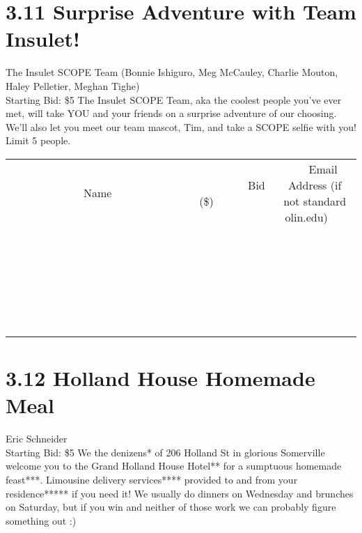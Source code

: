 \documentclass[11pt]{article}
\begin{document}
\section*{3.11 Surprise Adventure with Team Insulet!}
The Insulet SCOPE Team (Bonnie Ishiguro, Meg McCauley, Charlie Mouton, Haley Pelletier, Meghan Tighe)
\\
Starting Bid: \$5
\newline
The Insulet SCOPE Team, aka the coolest people you've ever met, will take YOU and your friends on a surprise adventure of our choosing. We'll also let you meet our team mascot, Tim, and take a SCOPE selfie with you! Limit 5 people.
\\[6ex]
\begin{tabular}{c c c}
~~~~~~~~~~~~~Name~~~~~~~~~~~~~ & ~~~~~~~~~Bid (\$)~~~~~~~~~  & ~~~Email Address (if not standard olin.edu)~~~\\
 & & \\
\hline
 & & \\
\hline
 & & \\
\hline
 & & \\
\hline
 & & \\
\hline
 & & \\
\hline
 & & \\
\hline
 & & \\
\hline
 & & \\
\hline
 & & \\
\hline
 & & \\
\hline
 & & \\
\hline
 & & \\
\hline
 & & \\
\hline
 & & \\
\hline
 & & \\
\hline
 & & \\
\hline
 & & \\
\hline
 & & \\
\hline
 & & \\
\hline
 & & \\
\hline
 & & \\
\hline
 & & \\
\hline
 & & \\
\hline
 & & \\
\hline
 & & \\
\hline
\end{tabular}
\newpage
\section*{3.12 Holland House Homemade Meal}
Eric Schneider
\\
Starting Bid: \$5
\newline
We the denizens* of 206 Holland St in glorious Somerville welcome you to the Grand Holland House Hotel** for a sumptuous homemade feast***. Limousine delivery services**** provided to and from your residence***** if you need it! We usually do dinners on Wednesday and brunches on Saturday, but if you win and neither of those work we can probably figure something out :)
\end{document}

